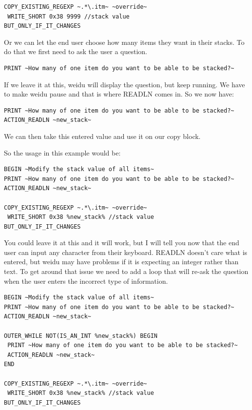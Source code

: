 \documentclass{article}
\begin{document}
\begin{verbatim}
COPY_EXISTING_REGEXP ~.*\.itm~ ~override~
 WRITE_SHORT 0x38 9999 //stack value
BUT_ONLY_IF_IT_CHANGES
\end{verbatim}

Or we can let the end user choose how many items they want in their stacks.
To do that we first need to ask the user a question.

\begin{verbatim}
PRINT ~How many of one item do you want to be able to be stacked?~
\end{verbatim}

If we leave it at this, weidu will display the question, but keep running.
We have to make weidu pause and that is where READLN comes in. So we now have:

\begin{verbatim}
PRINT ~How many of one item do you want to be able to be stacked?~
ACTION_READLN ~new_stack~
\end{verbatim}

We can then take this entered value and use it on our copy block.

So the usage in this example would be:

\begin{verbatim}
BEGIN ~Modify the stack value of all items~
PRINT ~How many of one item do you want to be able to be stacked?~
ACTION_READLN ~new_stack~

COPY_EXISTING_REGEXP ~.*\.itm~ ~override~
 WRITE_SHORT 0x38 %new_stack% //stack value
BUT_ONLY_IF_IT_CHANGES
\end{verbatim}

You could leave it at this and it will work, but I will tell you now that the end
user can input any character from their keyboard.  READLN doesn't care what is
entered, but weidu may have problems if it is expecting an integer rather than text.
To get around that issue we need to add a loop that will re-ask the question when the
user enters the incorrect type of information.

\begin{verbatim}
BEGIN ~Modify the stack value of all items~
PRINT ~How many of one item do you want to be able to be stacked?~
ACTION_READLN ~new_stack~

OUTER_WHILE NOT(IS_AN_INT %new_stack%) BEGIN
 PRINT ~How many of one item do you want to be able to be stacked?~
 ACTION_READLN ~new_stack~
END

COPY_EXISTING_REGEXP ~.*\.itm~ ~override~
 WRITE_SHORT 0x38 %new_stack% //stack value
BUT_ONLY_IF_IT_CHANGES
\end{verbatim}
\end{document}
